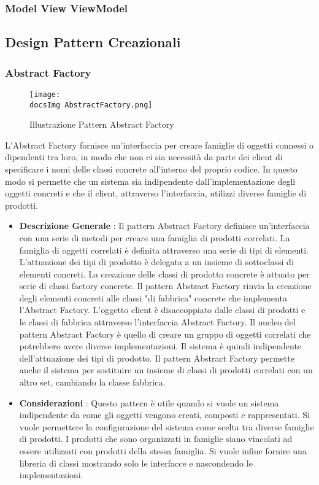 {{		\subsubsection{Model View ViewModel}{
		}
	}
	\subsection{Design Pattern Creazionali}{
		\subsubsection{Abstract Factory}{
			\begin{figure}[ht]
				\centering
				\texttt{[image: \\docsImg AbstractFactory.png]}
				\caption{Illustrazione Pattern Abstract Factory}
				\label{Illustrazione Pattern Abstract Factory}
			\end{figure}
			L'Abstract Factory fornisce un'interfaccia per creare famiglie di oggetti connessi o dipendenti tra loro, in modo che non ci sia necessità da parte dei client di specificare i nomi delle classi concrete all'interno del proprio codice.
			In questo modo si permette che un sistema sia indipendente dall'implementazione degli oggetti concreti e che il client, attraverso l'interfaccia, utilizzi diverse famiglie di prodotti.
			\begin{itemize}\itemsep1pt
				\item \textbf{Descrizione Generale} : Il pattern Abstract Factory definisce un'interfaccia con una serie di metodi per creare una famiglia di prodotti correlati. La famiglia di oggetti correlati è definita attraverso una serie di tipi di elementi. L'attuazione dei tipi di prodotto è delegata a un insieme di sottoclassi di elementi concreti. La creazione delle classi di prodotto concrete è attuato per serie di classi factory concrete. Il pattern Abstract Factory rinvia la creazione degli elementi concreti alle classi "di fabbrica" concrete che implementa l'Abstract Factory. L'oggetto client è disaccoppiato dalle classi di prodotti e le classi di fabbrica attraverso l'interfaccia Abstract Factory. Il nucleo del pattern Abstract Factory è quello di creare un gruppo di oggetti correlati che potrebbero avere diverse implementazioni. Il sistema è quindi indipendente dell'attuazione dei tipi di prodotto. Il pattern Abstract Factory permette anche il sistema per sostituire un insieme di classi di prodotti correlati con un altro set, cambiando la classe fabbrica.
				\item \textbf{Considerazioni} : Questo pattern è utile quando si vuole un sistema indipendente da come gli oggetti vengono creati, composti e rappresentati. Si vuole permettere la configurazione del sistema come scelta tra diverse famiglie di prodotti. I prodotti che sono organizzati in famiglie siano vincolati ad essere utilizzati con prodotti della stessa famiglia. Si vuole infine fornire una libreria di classi mostrando solo le interfacce e nascondendo le implementazioni.

\end{itemize}}}}
